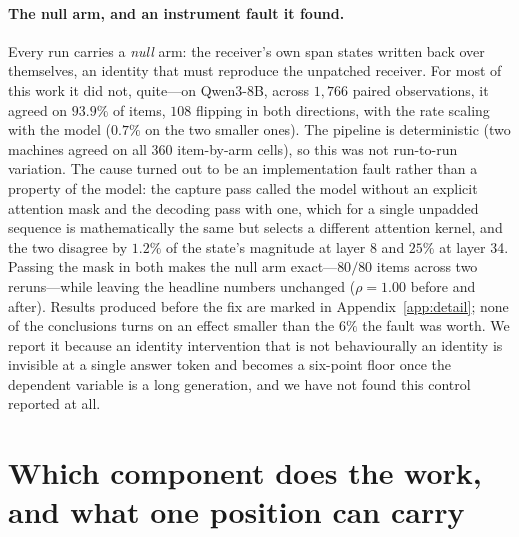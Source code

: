 \documentclass{article}
\begin{document}
\paragraph{The null arm, and an instrument fault it found.} Every run carries a
\emph{null} arm: the receiver's own span states written back over themselves, an
identity that must reproduce the unpatched receiver. For most of this work it
did not, quite---on Qwen3-8B, across $1{,}766$ paired observations, it agreed on
$93.9\%$ of items, $108$ flipping in both directions, with the rate scaling with
the model ($0.7\%$ on the two smaller ones). The pipeline is deterministic (two
machines agreed on all $360$ item-by-arm cells), so this was not run-to-run
variation. The cause turned out to be an implementation fault rather than a
property of the model: the capture pass called the model without an explicit
attention mask and the decoding pass with one, which for a single unpadded
sequence is mathematically the same but selects a different attention kernel,
and the two disagree by $1.2\%$ of the state's magnitude at layer 8 and $25\%$
at layer 34. Passing the mask in both makes the null arm exact---$80/80$ items
across two reruns---while leaving the headline numbers unchanged ($\rho = 1.00$
before and after). Results produced before the fix are marked in
Appendix~\ref{app:detail}; none of the conclusions turns on an effect smaller
than the $6\%$ the fault was worth. We report it because an identity
intervention that is not behaviourally an identity is invisible at a single
answer token and becomes a six-point floor once the dependent variable is a
long generation, and we have not found this control reported at all.

\section{Which component does the work, and what one position can carry}
\label{sec:decomp}
\end{document}
